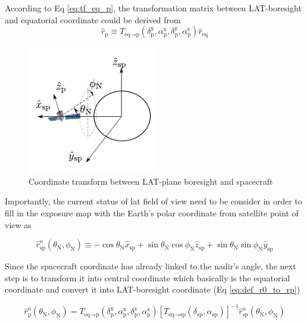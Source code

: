 According to Eq \ref{eq:tf_eq_p}, the transformation matrix between LAT-boresight and equatorial coordinate could be derived from
\begin{equation}
    \hat{r}_\text{p} \equiv T_{\text{eq}\rightarrow\text{p}} (\delta^\text{x}_\text{p}, \alpha^\text{x}_\text{p}, \delta^\text{z}_\text{p}, \alpha^\text{z}_\text{p}) \hat{r}_\text{eq}
\end{equation}

\begin{figure}[h!]
    \centering
    \includegraphics[width=0.5\textwidth]{img/fig_coordinate/coord_eq_p.pdf}
    \caption{Coordinate transform between LAT-plane boresight and spacecraft}
\end{figure}

Importantly, the current status of lat field of view need to be consider in order to fill in the exposure map with the Earth’s polar coordinate from satellite point of view as 

\begin{equation}
    \hat{r}^\text{o}_\text{sp} (\theta_\text{N}, \phi_\text{N}) \equiv -\cos\theta_\text{N}\hat{x}_\text{sp} + \sin\theta_\text{N}\cos\phi_\text{N}\hat{z}_\text{sp} + \sin\theta_\text{N}\sin\phi_\text{N}\hat{y}_\text{sp}
    \label{eq:def_r0}
\end{equation}

Since the spacecraft coordinate has already linked to the nadir's angle, the next step is to transform it into central coordinate which basically is the equatorial coordinate and convert it into LAT-boresight coordinate (Eq \ref{eq:def_r0_to_rp})

\begin{equation}
    \hat{r}^\text{o}_\text{p} (\theta_\text{N}, \phi_\text{N}) = T_{\text{eq}\rightarrow\text{p}} (\delta^\text{x}_\text{p}, \alpha^\text{x}_\text{p}, \delta^\text{z}_\text{p}, \alpha^\text{z}_\text{p}) \left[T_{\text{eq}\rightarrow\text{sp}} (\delta_\text{sp}, \alpha_\text{sp})\right]^{-1} \hat{r}^\text{o}_\text{sp} (\theta_\text{N}, \phi_\text{N})
    \label{eq:def_r0_to_rp}
\end{equation}


